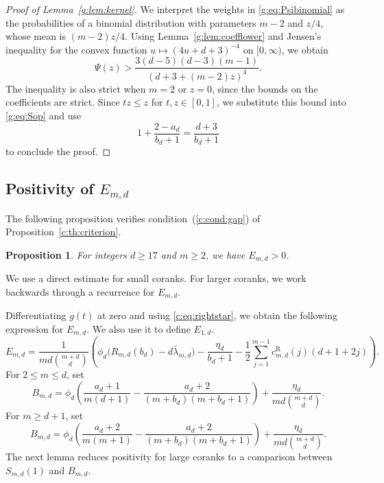 \documentclass[10pt,a4paper]{article}
\numberwithin{equation}{section}
\newtheorem{proposition}[theorem]{Proposition}
\theoremstyle{remark}\newtheorem{remark}[theorem]{Remark}
\begin{document}
\begin{proof}[Proof of Lemma~\ref{g:lem:kernel}]
We interpret the weights in \eqref{g:eq:Psibinomial} as the probabilities of a
binomial distribution with parameters $m-2$ and $z/4$, whose mean is
$(m-2)z/4$. Using Lemma~\ref{g:lem:coefflower} and Jensen's inequality
for the convex function $u\mapsto(4u+d+3)^{-4}$ on $[0,\infty)$,
we obtain
\[
 \Psi(z)>
 \frac{3(d-5)(d-3)(m-1)}{(d+3+(m-2)z)^4}.
\]
The inequality is also strict when $m=2$ or $z=0$, since the bounds
on the coefficients are strict.
Since $tz\le z$ for $t,z\in[0,1]$, we substitute this bound into
\eqref{g:eq:Sop} and use
\[
 1+\frac{2-a_d}{b_d+1}=\frac{d+3}{b_d+1}
\]
to conclude the proof.
\end{proof}

\subsection{Positivity of \texorpdfstring{$E_{m,d}$}{E}}\label{sec:positivity}
The following proposition verifies condition~(\ref{c:cond:gap}) of
Proposition~\ref{c:th:criterion}.

\begin{proposition}\label{g:th:gap}
For integers $d\ge17$ and $m\ge2$, we have $E_{m,d}>0$.
\end{proposition}

We use a direct estimate for small coranks. For larger coranks,
we work backwards through a recurrence for $E_{m,d}$.

Differentiating $g(t)$ at zero and using \eqref{c:eq:rightstar}, we obtain
the following expression for $E_{m,d}$. We also use it to define $E_{1,d}$.
\begin{equation}\label{g:eq:gap}
 E_{m,d}
 =\frac{1}{md\binom{m+d}{d}}\left(
 \phi_d\bigl(R_{m,d}(b_d)-d\bar\lambda_{m,d}\bigr)
 -\frac{\eta_d}{b_d+1}
 -\frac12\sum_{j=1}^{m-1}c_{m,d}^{\mathrm R}(j)(d+1+2j)\right).
\end{equation}
For $2\le m\le d$, set
\begin{equation}\label{g:eq:B}
 B_{m,d}=\phi_d\left(\frac{a_d+1}{m(d+1)}
 -\frac{a_d+2}{(m+b_d)(m+b_d+1)}\right)
 +\frac{\eta_d}{md\binom{m+d}{d}}.
\end{equation}
For $m\ge d+1$, set
\begin{equation}\label{g:eq:Blarge}
 B_{m,d}=\phi_d\left(\frac{a_d+2}{m(m+1)}
 -\frac{a_d+2}{(m+b_d)(m+b_d+1)}\right)
 +\frac{\eta_d}{md\binom{m+d}{d}}.
\end{equation}
The next lemma reduces positivity for large coranks to a comparison
between $S_{m,d}(1)$ and $B_{m,d}$.
\end{document}
